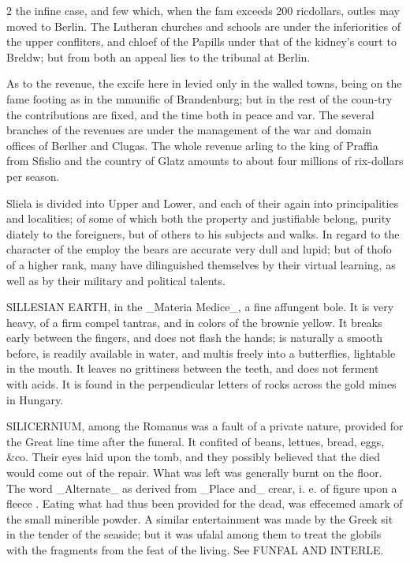 \documentclass[10pt]{article}
\begin{document}
\begin{multicols}{2}
the infine case, and few which, when the fam exceeds 200 ricdollars, outles may moved to Berlin. The Lutheran churches and schools are under the inferiorities of the upper confliters, and chloef of the Papills under that of the kidney's court to Breldw; but from both an appeal lies to the tribunal at Berlin.

As to the revenue, the excife here in levied only in the walled towns, being on the fame footing as in the mmunific of Brandenburg; but in the rest of the coun-try the contributions are fixed, and the time both in peace and var. The several branches of the revenues are under the management of the war and domain offices of Berlher and Clugas. The whole revenue arling to the king of Praffia from Sfislio and the country of Glatz amounts to about four millions of rix-dollars per season.

Sliela is divided into Upper and Lower, and each of their again into principalities and localities; of some of which both the property and justifiable belong, purity diately to the foreigners, but of others to his subjects and walks. In regard to the character of the employ the bears are accurate very dull and lupid; but of thofo of a higher rank, many have dilinguished themselves by their virtual learning, as well as by their military and political talents.

SILLESIAN EARTH, in the \_Materia Medice\_, a fine affungent bole. It is very heavy, of a firm compel tantras, and in colors of the brownie yellow. It breaks early between the fingers, and does not flash the hands; is naturally a smooth before, is readily available in water, and multis freely into a butterflies, lightable in the mouth. It leaves no grittiness between the teeth, and does not ferment with acids. It is found in the perpendicular letters of rocks across the gold mines in Hungary.

SILICERNIUM, among the Romanus was a fault of a private nature, provided for the Great line time after the funeral. It confited of beans, lettues, bread, eggs, \&co. Their eyes laid upon the tomb, and they possibly believed that the died would come out of the repair. What was left was generally burnt on the floor. The word \_Alternate\_ as derived from \_Place and\_ crear, i. e. of figure upon a fleece . Eating what had thus been provided for the dead, was effecemed amark of the small minerible powder. A similar entertainment was made by the Greek sit in the tender of the seaside; but it was ufalal among them to treat the globils with the fragments from the feat of the living. See FUNFAL AND INTERLE.


\end{multicols}
\end{document}
